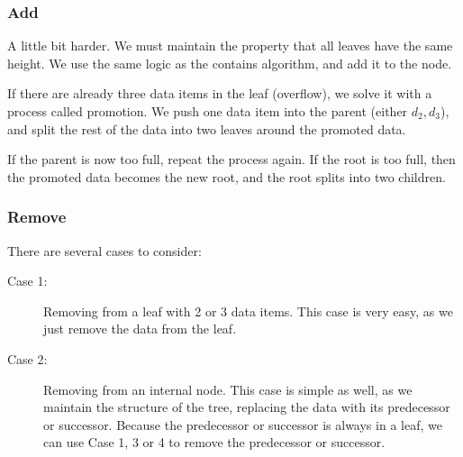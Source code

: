 \subsubsection{Add}
A little bit harder. We must maintain the property that all leaves have the same height. We use the same logic as the contains algorithm, and add it to the node. \par
If there are already three data items in the leaf (overflow), we solve it with a process called promotion. We push one data item into the parent (either \( d_{2},d_{3} \)), and split the rest of the data into two leaves around the promoted data. \par
If the parent is now too full, repeat the process again. If the root is too full, then the promoted data becomes the new root, and the root splits into two children.

\subsubsection{Remove}
There are several cases to consider:
\begin{description}
	\item[Case 1:] Removing from a leaf with 2 or 3 data items. This case is very easy, as we just remove the data from the leaf.
	\item[Case 2:] Removing from an internal node. This case is simple as well, as we maintain the structure of the tree, replacing the data with its predecessor or successor. Because the predecessor or successor is always in a leaf, we can use Case 1, 3 or 4 to remove the predecessor or successor.
\end{description}
